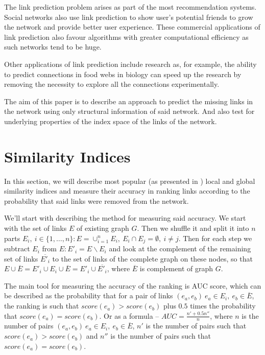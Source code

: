\documentclass{llncs}
\begin{document}
The link prediction problem arises as part of the most recommendation systems. Social networks also use link prediction to show user's potential friends to grow the network and provide better user experience. These commercial applications of link prediction also favour algorithms with greater computational efficiency as such networks tend to be huge.

Other applications of link prediction include research as, for example, the ability to predict connections in food webs in biology can speed up the research by removing the necessity to explore all the connections experimentally.

The aim of this paper is to describe an approach to predict the missing links in the network using only structural information of said network. And also test for underlying properties of the index space of the links of the network.
%
\section{Similarity Indices}
%
In this section, we will describe most popular (as presented in \cite{survey}) local and global similarity indices and measure their accuracy in ranking links according to the probability that said links were removed from the network.

We'll start with describing the method for measuring said accuracy. We start with the set of links $E$ of existing graph $G$. Then we shuffle it and split it into $n$ parts $E_i, \ i \in \{1, \ldots, n\} : E = \cup_{i = 1}^{n} E_i, \ E_i \cap E_j = \emptyset, \ i \neq j$. Then for each step we subtract $E_i$ from $E : E'_i = E \backslash E_i$ and look at the complement of the remaining set of links $\overline{E'_i}$ to the set of links of the complete graph on these nodes, so that $E \cup \overline{E} = E'_i \cup E_i \cup \overline{E} = E'_i \cup \overline{E'_i}$, where $\overline{E}$ is complement of graph $G$.

The main tool for measuring the accuracy of the ranking is AUC \cite{auc} score, which can be described as the probability that for a pair of links $(e_a, e_b) \ e_a \in E_i, \ e_b \in \overline{E}$, the ranking is such that $score(e_a) > score(e_b)$ plus $0.5$ times the probability that $score(e_a) = score(e_b)$. Or as a formula -- $AUC = \frac{n' + 0.5 n''}{n}$, where $n$ is the number of pairs $(e_a, e_b) \ e_a \in E_i, \ e_b \in \overline{E}$, $n'$ is the number of pairs such that $score(e_a) > score(e_b)$ and $n''$ is the number of pairs such that $score(e_a) = score(e_b)$.
\end{document}
